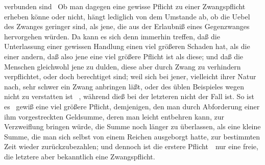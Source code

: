 \begin{aufza}
verbunden sind \usw\ Ob man dagegen eine gewisse Pflicht zu einer Zwangspflicht erheben könne oder nicht, hängt lediglich von dem Umstande ab, ob die Uebel des Zwanges geringer sind, als jene, die aus der Erlaubniß eines Gegenzwanges hervorgehen würden. Da kann es sich denn immerhin treffen, daß die Unterlassung einer gewissen Handlung einen viel größeren Schaden hat, als die einer andern, daß also jene eine viel größere Pflicht ist als diese; und daß die Menschen gleichwohl jene zu dulden, diese aber durch Zwang zu verhindern verpflichtet, oder doch berechtiget sind; weil sich bei jener, vielleicht ihrer Natur nach, sehr schwer ein Zwang anbringen läßt, oder des üblen Beispieles wegen nicht zu verstatten ist \udgl\ , während dieß bei der letzteren nicht der Fall ist. So ist es \zB\  gewiß eine viel größere Pflicht, demjenigen, den man durch Abforderung einer ihm vorgestreckten Geldsumme, deren man leicht entbehren kann, zur Verzweiflung bringen würde, die Summe noch länger zu überlassen, als eine kleine Summe, die man sich selbst von einem Reichen ausgeborgt hatte, zur bestimmten Zeit wieder zurückzubezahlen; und dennoch ist die erstere Pflicht~\ nur eine freie, die letztere aber bekanntlich eine Zwangspflicht. \Usw\
\end{aufza}

